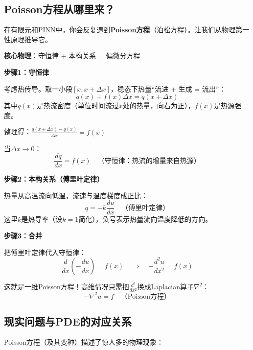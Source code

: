 \subsection{Poisson方程从哪里来？}

在有限元和PINN中，你会反复遇到\textbf{Poisson方程}（泊松方程）。让我们从物理第一性原理推导它。

\begin{keyidea}
\textbf{核心物理}：守恒律 + 本构关系 = 偏微分方程

\textbf{步骤1：守恒律}

考虑热传导。取一小段$[x, x+\Delta x]$，稳态下热量``流进 + 生成 = 流出''：
\[
q(x) + f(x)\Delta x = q(x + \Delta x)
\]
其中$q(x)$是热流密度（单位时间流过$x$处的热量，向右为正），$f(x)$是热源强度。

整理得：$\frac{q(x+\Delta x) - q(x)}{\Delta x} = f(x)$

当$\Delta x \to 0$：
\[
\frac{dq}{dx} = f(x) \quad \text{（守恒律：热流的增量来自热源）}
\]

\textbf{步骤2：本构关系（傅里叶定律）}

热量从高温流向低温，流速与温度梯度成正比：
\[
q = -k\frac{du}{dx} \quad \text{（傅里叶定律）}
\]
这里$k$是热导率（设$k=1$简化），负号表示热量流向温度降低的方向。

\textbf{步骤3：合并}

把傅里叶定律代入守恒律：
\[
\frac{d}{dx}\left(-\frac{du}{dx}\right) = f(x) \quad \Rightarrow \quad \boxed{-\frac{d^2u}{dx^2} = f(x)}
\]

这就是一维Poisson方程！高维情况只需把$\frac{d^2}{dx^2}$换成Laplacian算子$\nabla^2$：
\[
-\nabla^2 u = f \quad \text{（Poisson方程）}
\]
\end{keyidea}

\subsection{现实问题与PDE的对应关系}

Poisson方程（及其变种）描述了惊人多的物理现象：

